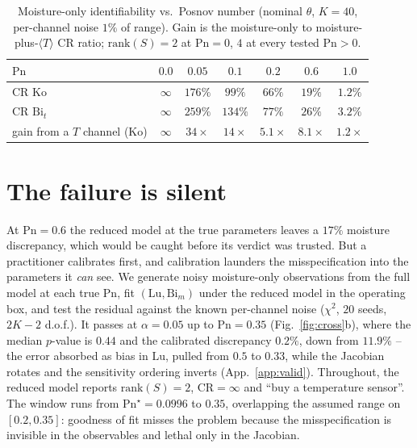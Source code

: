 \documentclass{article}
\begin{document}
\begin{table}[!htbp]\centering\small
\caption{Moisture-only identifiability vs.\ Posnov number (nominal $\theta$, $K{=}40$, per-channel
noise $1\%$ of range). Gain is the moisture-only to moisture-plus-$\langle T\rangle$ CR ratio;
$\mathrm{rank}(S){=}2$ at $\mathrm{Pn}{=}0$, $4$ at every tested $\mathrm{Pn}{>}0$.}
\label{tab:pn}
\begin{tabular}{lcccccc}\toprule
$\mathrm{Pn}$ & $0.0$ & $0.05$ & $0.1$ & $0.2$ & $0.6$ & $1.0$\\\midrule
CR $\mathrm{Ko}$ & $\infty$ & $176\%$ & $99\%$ & $66\%$ & $19\%$ & $1.2\%$\\
CR $\mathrm{Bi}_t$ & $\infty$ & $259\%$ & $134\%$ & $77\%$ & $26\%$ & $3.2\%$\\\midrule
gain from a $T$ channel ($\mathrm{Ko}$) & $\infty$ & $34\times$ & $14\times$ & $5.1\times$ & $8.1\times$ & $1.2\times$\\
\bottomrule\end{tabular}

\end{table}

\section{The failure is silent}\label{sec:silent}
At $\mathrm{Pn}{=}0.6$ the reduced model at the true parameters leaves a $17\%$ moisture
discrepancy, which would be caught before its verdict was trusted. But a practitioner calibrates
first, and calibration launders the misspecification into the parameters it \emph{can} see. We generate noisy moisture-only observations from the
full model at each true $\mathrm{Pn}$, fit $(\mathrm{Lu},\mathrm{Bi}_m)$ under the reduced model in
the operating box, and test the residual against the known per-channel noise ($\chi^2$, $20$ seeds,
$2K{-}2$ d.o.f.). It passes at $\alpha{=}0.05$ up to $\mathrm{Pn}{=}0.35$ (Fig.~\ref{fig:cross}b),
where the median $p$-value is $0.44$ and the calibrated discrepancy $0.2\%$, down from $11.9\%$ --
the error absorbed as bias in $\mathrm{Lu}$, pulled from $0.5$ to $0.33$, while the Jacobian rotates
and the sensitivity ordering inverts (App.~\ref{app:valid}). Throughout, the reduced model reports $\mathrm{rank}(S)=2$, $\mathrm{CR}=\infty$ and ``buy a temperature sensor''.
The window runs from $\mathrm{Pn}^\star{=}0.0996$ to $0.35$, overlapping the assumed range on
$[0.2,0.35]$: goodness of fit misses the problem because the misspecification is invisible in the
observables and lethal only in the Jacobian.
\end{document}
